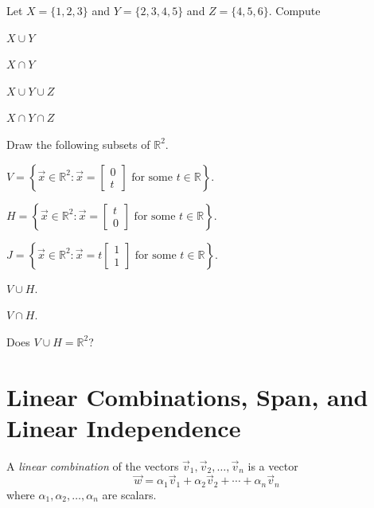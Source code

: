 \documentclass{problemset}
\newcommand{\R}{\mathbb{R}}
\begin{document}
	\question
	Let $X=\{1,2,3\}$ and $Y=\{2,3,4,5\}$ and $Z=\{4,5,6\}$.  Compute
	\begin{parts}
		\item $X\cup Y$
		\item $X\cap Y$
		\item $X\cup Y\cup Z$
		\item $X\cap Y\cap Z$
	\end{parts}

	\question
	Draw the following subsets of $\R^2$.
	\begin{parts}
		\item $V=\left\{\vec x\in\R^2:\vec x=\begin{bmatrix}0\\t\end{bmatrix}\text{ for some }t\in\R\right\}$.
		\item $H=\left\{\vec x\in\R^2:\vec x=\begin{bmatrix}t\\0\end{bmatrix}\text{ for some }t\in\R\right\}$.
		\item $J=\left\{\vec x\in\R^2:\vec x=t\begin{bmatrix}1\\1\end{bmatrix}\text{ for some }t\in\R\right\}$.
		\item $V\cup H$.
		\item $V\cap H$.
		\item Does $V\cup H=\R^2$?
	\end{parts}


	\vspace{-1em}
\section*{Linear Combinations, Span, and Linear Independence}
	\vspace{-1em}

	\begin{definition}
		A \emph{linear combination} of the vectors $\vec v_1,\vec v_2,\ldots,\vec v_n$ is
		a vector
		\[
			\vec w = \alpha_1\vec v_1+\alpha_2\vec v_2+\cdots+\alpha_n\vec v_n
		\]
		where $\alpha_1,\alpha_2,\ldots,\alpha_n$ are scalars.
	\end{definition}
\end{document}
